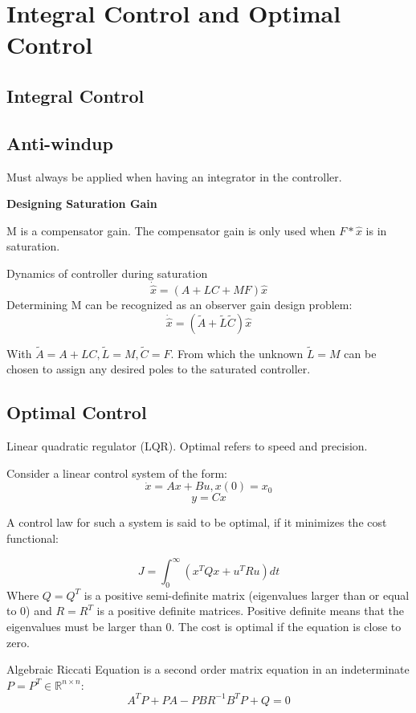 \section{Integral Control and Optimal Control}

\subsection{Integral Control}






\subsection{Anti-windup}
Must always be applied when having an integrator in the controller.

\textbf {Designing Saturation Gain}

M is a compensator gain. The compensator gain is only used when $F*\hat{x}$ is in saturation.

Dynamics of controller during saturation
$$ \dot{\hat{x}} = (A+LC+MF)\hat{x}$$
Determining M can be recognized as an observer gain design problem:
$$ \dot{\hat{x}} = (\tilde{A}+\tilde{L}\tilde{C}) \hat{x}$$

With $\tilde{A}=A+LC, \tilde{L}=M, \tilde{C}=F$. From which the unknown $\tilde{L}=M$ can be chosen to assign
any desired poles to the saturated controller.

\subsection{Optimal Control}

Linear quadratic regulator (LQR). Optimal refers to speed and precision.

Consider a linear control system of the form:
$$ \dot{x} = Ax + Bu, x(0)=x_0 $$
$$ y = Cx $$

A control law for such a system is said to be optimal, if it minimizes the cost functional:

$$ J = \int_{0}^{\infty} (x^TQx + u^TRu) dt $$
Where $Q=Q^T$ is a positive semi-definite matrix (eigenvalues larger than or equal to 0) and $R=R^T$ is a positive definite matrices.
Positive definite means that the eigenvalues must be larger than 0.
The cost is optimal if the equation is close to zero.


Algebraic Riccati Equation is a second order matrix equation in an indeterminate $P=P^T \in \mathbb{R}^{n \times n}$:
$$ A^TP + PA - PBR^{-1}B^TP + Q = 0 $$

